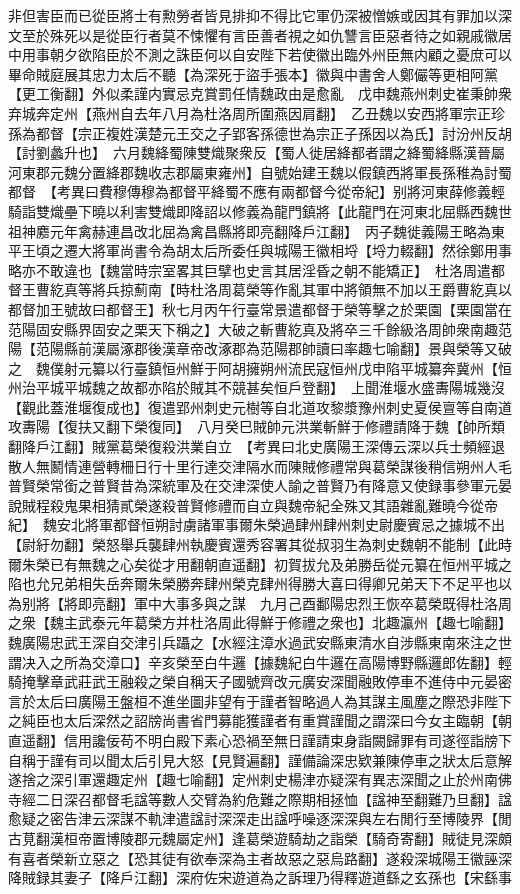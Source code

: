 非但害臣而已從臣將士有勲勞者皆見排抑不得比它軍仍深被憎嫉或因其有罪加以深文至於殊死以是從臣行者莫不悚懼有言臣善者視之如仇讐言臣惡者待之如親戚徽居中用事朝夕欲陷臣於不測之誅臣何以自安陛下若使徽出臨外州臣無内顧之憂庶可以畢命賊庭展其忠力太后不聽【為深死于盜手張本】徽與中書舍人鄭儼等更相阿黨【更工衡翻】外似柔謹内實忌克賞罰任情魏政由是愈亂　戊申魏燕州刺史崔秉帥衆弃城奔定州【燕州自去年八月為杜洛周所圍燕因肩翻】　乙丑魏以安西將軍宗正珍孫為都督【宗正複姓漢楚元王交之子郢客孫德世為宗正子孫因以為氏】討汾州反胡【討劉蠡升也】　六月魏絳蜀陳雙熾聚衆反【蜀人徙居絳都者謂之絳蜀絳縣漢晉屬河東郡元魏分置絳郡魏收志郡屬東雍州】自號始建王魏以假鎮西將軍長孫稚為討蜀都督　【考異曰費穆傳穆為都督平絳蜀不應有兩都督今從帝紀】别將河東薛修義輕騎詣雙熾壘下曉以利害雙熾即降詔以修義為龍門鎮將【此龍門在河東北屈縣西魏世祖神䴥元年禽赫連昌改北屈為禽昌縣將即亮翻降戶江翻】　丙子魏徙義陽王略為東平王頃之遷大將軍尚書令為胡太后所委任與城陽王徽相埒【埒力輟翻】然徐鄭用事略亦不敢違也【魏當時宗室畧其巨擘也史言其居淫昏之朝不能矯正】　杜洛周遣都督王曹紇真等將兵掠薊南【時杜洛周葛榮等作亂其軍中將領無不加以王爵曹紇真以都督加王號故曰都督王】秋七月丙午行臺常景遣都督于榮等擊之於栗園【栗園當在范陽固安縣界固安之栗天下稱之】大破之斬曹紇真及將卒三千餘級洛周帥衆南趣范陽【范陽縣前漢屬涿郡後漢章帝改涿郡為范陽郡帥讀曰率趣七喻翻】景與榮等又破之　魏僕射元纂以行臺鎮恒州鮮于阿胡擁朔州流民寇恒州戊申陷平城纂奔冀州【恒州治平城平城魏之故都亦陷於賊其不競甚矣恒戶登翻】　上聞淮堰水盛夀陽城幾沒【觀此蓋淮堰復成也】復遣郢州刺史元樹等自北道攻黎漿豫州刺史夏侯亶等自南道攻夀陽【復扶又翻下榮復同】　八月癸巳賊帥元洪業斬鮮于修禮請降于魏【帥所類翻降戶江翻】賊黨葛榮復殺洪業自立　【考異曰北史廣陽王深傳云深以兵士頻經退散人無鬭情連營轉柵日行十里行達交津隔水而陳賊修禮常與葛榮謀後稍信朔州人毛普賢榮常銜之普賢昔為深統軍及在交津深使人諭之普賢乃有降意又使録事參軍元晏說賊程殺鬼果相猜貳榮遂殺普賢修禮而自立與魏帝紀全殊又其語雜亂難曉今從帝紀】　魏安北將軍都督恒朔討虜諸軍事爾朱榮過肆州肆州刺史尉慶賓忌之據城不出【尉紆勿翻】榮怒舉兵襲肆州執慶賓還秀容署其從叔羽生為刺史魏朝不能制【此時爾朱榮已有無魏之心矣從才用翻朝直遥翻】初賀拔允及弟勝岳從元纂在恒州平城之陷也允兄弟相失岳奔爾朱榮勝奔肆州榮克肆州得勝大喜曰得卿兄弟天下不足平也以為别將【將即亮翻】軍中大事多與之謀　九月己酉鄱陽忠烈王恢卒葛榮既得杜洛周之衆【魏主武泰元年葛榮方并杜洛周此得鮮于修禮之衆也】北趣瀛州【趣七喻翻】魏廣陽忠武王深自交津引兵躡之【水經注漳水過武安縣東清水自涉縣東南來注之世謂决入之所為交漳口】辛亥榮至白牛邏【據魏紀白牛邏在高陽博野縣邏郎佐翻】輕騎掩擊章武莊武王融殺之榮自稱天子國號齊改元廣安深聞融敗停車不進侍中元晏密言於太后曰廣陽王盤桓不進坐圖非望有于謹者智略過人為其謀主風塵之際恐非陛下之純臣也太后深然之詔牓尚書省門募能獲謹者有重賞謹聞之謂深曰今女主臨朝【朝直遥翻】信用讒佞苟不明白殿下素心恐禍至無日謹請束身詣闕歸罪有司遂徑詣牓下自稱于謹有司以聞太后引見大怒【見賢遍翻】謹備論深忠欵兼陳停車之狀太后意解遂捨之深引軍還趣定州【趣七喻翻】定州刺史楊津亦疑深有異志深聞之止於州南佛寺經二日深召都督毛諡等數人交臂為約危難之際期相拯恤【諡神至翻難乃旦翻】諡愈疑之密告津云深謀不軌津遣諡討深深走出諡呼噪逐深深與左右閒行至博陵界【閒古莧翻漢桓帝置博陵郡元魏屬定州】逢葛榮遊騎劫之詣榮【騎奇寄翻】賊徒見深頗有喜者榮新立惡之【恐其徒有欲奉深為主者故惡之惡烏路翻】遂殺深城陽王徽誣深降賊録其妻子【降戶江翻】深府佐宋遊道為之訴理乃得釋遊道繇之玄孫也【宋繇事